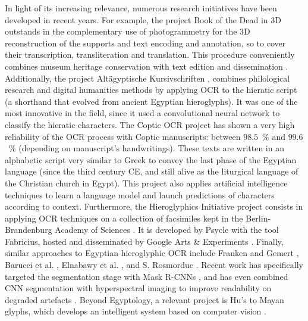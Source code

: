\documentclass[10pt,onecolumn,letterpaper]{article}
\begin{document}
In light of its increasing relevance, numerous research initiatives have been developed in recent years. For example, the project Book of the Dead in 3D \cite{lucarelli2023b} outstands in the complementary use of photogrammetry for the 3D reconstruction of the supports and text encoding and annotation, so to cover their transcription, transliteration and translation. This procedure conveniently combines museum heritage conservation with text edition and dissemination \cite{lucarelli2019}. Additionally, the project Altägyptische Kursivschriften \cite{konrad2023}, combines philological research and digital humanities methods by applying OCR to the hieratic script (a shorthand that evolved from ancient Egyptian hieroglyphs). It was one of the most innovative in the field, since it used a convolutional neural network to classify the hieratic characters. The Coptic OCR project \cite{miyagawa2019} has shown a very high reliability of the OCR process with Coptic manuscripts: between $98.5$~\% and $99.6$~\% (depending on manuscript’s handwritings). These texts are written in an alphabetic script very similar to Greek to convey the last phase of the Egyptian language (since the third century CE, and still alive as the liturgical language of the Christian church in Egypt). This project also applies artificial intelligence techniques to learn a language model and launch predictions of characters according to context. Furthermore, the Hieroglyphics Initiative project consists in applying OCR techniques on a collection of facsimiles kept in the Berlin-Brandenburg Academy of Sciences \cite{Ubisoft17}. It is developed by Psycle \cite{Psycle17} with the tool Fabricius, hosted and disseminated by Google Arts \& Experiments \cite{Google17, kelly2021}. Finally, similar approaches to Egyptian hieroglyphic OCR include Franken and Gemert \cite{franken2013}, Barucci et al. \cite{barucci2021}, Elnabawy et al. \cite{elnabawy2018} \cite{elnabawy2021}, and S. Rosmorduc \cite{rosmorduc2020}. Recent work has specifically targeted the segmentation stage with Mask R-CNNs \cite{Guidi2023Segmentation}, and has even combined CNN segmentation with hyperspectral imaging to improve readability on degraded artefacts \cite{Cucci2024HSI}. Beyond Egyptology, a relevant project is Hu’s to Mayan glyphs, which develops an intelligent system based on computer vision \cite{hu2017}.
\end{document}
